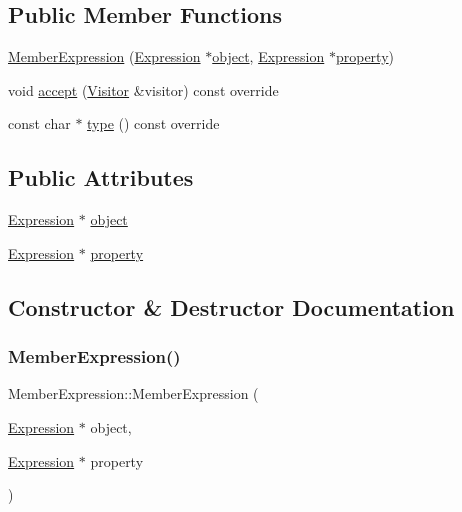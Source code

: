 \subsection*{Public Member Functions}
\begin{DoxyCompactItemize}
\item 
\hyperlink{struct_member_expression_a9a3eaa90cb6280ad3e221694632c22f5}{Member\+Expression} (\hyperlink{struct_expression}{Expression} $\ast$\hyperlink{struct_member_expression_a338f9515daed926c07fd717b9b728f58}{object}, \hyperlink{struct_expression}{Expression} $\ast$\hyperlink{struct_member_expression_a7b33bb4629162523bddbb397b180e31e}{property})
\item 
void \hyperlink{struct_member_expression_a04c3360eda4db02e733746882830b92c}{accept} (\hyperlink{struct_visitor}{Visitor} \&visitor) const override
\item 
const char $\ast$ \hyperlink{struct_member_expression_a2b3653ea6c4b7447d3eebf21d528d847}{type} () const override
\end{DoxyCompactItemize}
\subsection*{Public Attributes}
\begin{DoxyCompactItemize}
\item 
\hyperlink{struct_expression}{Expression} $\ast$ \hyperlink{struct_member_expression_a338f9515daed926c07fd717b9b728f58}{object}
\item 
\hyperlink{struct_expression}{Expression} $\ast$ \hyperlink{struct_member_expression_a7b33bb4629162523bddbb397b180e31e}{property}
\end{DoxyCompactItemize}


\subsection{Constructor \& Destructor Documentation}
\mbox{\label{struct_member_expression_a9a3eaa90cb6280ad3e221694632c22f5}} 
\subsubsection{\texorpdfstring{Member\+Expression()}{MemberExpression()}}
{\footnotesize\ttfamily Member\+Expression\+::\+Member\+Expression (\begin{DoxyParamCaption}\item[{\hyperlink{struct_expression}{Expression} $\ast$}]{object,  }\item[{\hyperlink{struct_expression}{Expression} $\ast$}]{property }\end{DoxyParamCaption})\hspace{0.3cm}{\ttfamily [inline]}}



